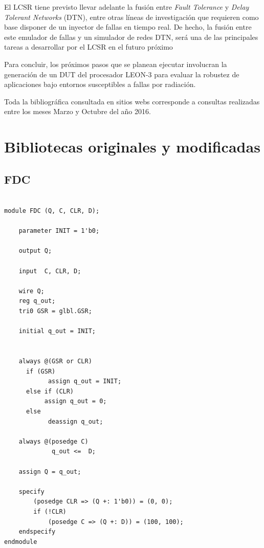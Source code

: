 \documentclass[a4paper,openright,12pt]{report}
\begin{document}
El LCSR  tiene previsto llevar adelante la fusión entre \textit{Fault Tolerance} y \textit{Delay Tolerant Networks} (DTN), entre otras líneas de investigación que requieren como base disponer de un inyector de fallas en tiempo real. De hecho, la fusión entre este emulador de fallas y un simulador de redes DTN, será una de las principales tareas a desarrollar por el LCSR en el futuro próximo

Para concluir, los próximos pasos que se planean ejecutar involucran la generación de un DUT del procesador LEON-3 para evaluar la robustez de aplicaciones bajo entornos susceptibles a fallas por radiación.

    




Toda la bibliográfica consultada en sitios webs corresponde a consultas realizadas entre los meses Marzo y Octubre del año 2016. 
\appendix
\chapter{Bibliotecas originales y modificadas }\label{aped.A}

\section{FDC}
\begin{lstlisting}

module FDC (Q, C, CLR, D);

    parameter INIT = 1'b0;

    output Q;

    input  C, CLR, D;

    wire Q;
    reg q_out;
    tri0 GSR = glbl.GSR;

    initial q_out = INIT;


    always @(GSR or CLR)
      if (GSR)
            assign q_out = INIT;
      else if (CLR)
           assign q_out = 0;
      else
            deassign q_out;

    always @(posedge C)
	         q_out <=  D;

    assign Q = q_out;

    specify
        (posedge CLR => (Q +: 1'b0)) = (0, 0);
        if (!CLR)
            (posedge C => (Q +: D)) = (100, 100);
    endspecify
endmodule
\end{lstlisting}
\end{document}
